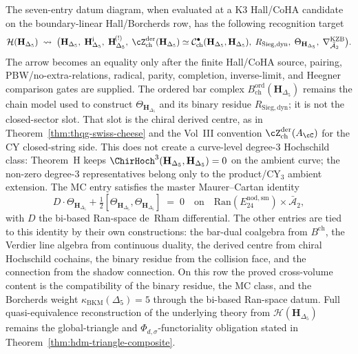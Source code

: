 \begin{remark}
\label{rem:hdm-1}
The seven-entry datum diagram, when evaluated at a K3 Hall/CoHA
candidate on the boundary-linear Hall/Borcherds row, has the following recognition
target
\[
\mathcal H(\mathbf H_{\Delta_5}) \;\leadsto\; \bigl(\mathbf H_{\Delta_5},\;
\mathbf H_{\Delta_5}^{\mathrm i},\;
\mathbf H_{\Delta_5}^{\!(!)},\;
\cZ^{\mathrm{der}}_{\mathrm{ch}}(\mathbf H_{\Delta_5})
\simeq \mathcal{C}^\bullet_{\mathrm{ch}}(\mathbf H_{\Delta_5},
\mathbf H_{\Delta_5}),\; R_{\mathrm{Sieg,dyn}},\;
\Theta_{\mathbf H_{\Delta_5}},\;
\nabla^{\mathrm{KZB}}_{\bar{\mathcal A}_2}\bigr).
\]
The arrow becomes an equality only after the finite Hall/CoHA source,
pairing, PBW/no-extra-relations, radical, parity, completion,
inverse-limit, and Heegner comparison gates are supplied.
The ordered bar complex $B^{\mathrm{ord}}_{\mathrm{ch}}
(\mathbf H_{\Delta_5})$ remains the chain model used to construct
$\Theta_{\mathbf H_{\Delta_5}}$ and its binary residue
$R_{\mathrm{Sieg,dyn}}$; it is not the closed-sector slot. That slot is
the chiral derived centre, as in Theorem~\ref{thm:thqg-swiss-cheese}
and the Vol~III convention
$\cZ^{\mathrm{der}}_{\mathrm{ch}}(A_\cC)$ for the CY closed-string
side. This does not create a curve-level degree-$3$ Hochschild class:
Theorem~H keeps
$\ChirHoch^3(\mathbf H_{\Delta_5},\mathbf H_{\Delta_5})=0$ on the
ambient curve; the non-zero degree-$3$ representatives belong only to
the product/CY$_3$ ambient extension.
The MC entry satisfies the master Maurer--Cartan identity
\[
D\cdot \Theta_{\mathbf H_{\Delta_5}} + \tfrac{1}{2}[\Theta_{\mathbf H_{\Delta_5}}, \Theta_{\mathbf H_{\Delta_5}}] \;=\; 0
\quad\text{on}\quad \mathrm{Ran}(E^{\mathrm{nod,sm}}_{24})\times\bar{\mathcal A}_2,
\]
with $D$ the bi-based Ran-space de~Rham differential. The other
entries are tied to this identity by their own constructions: the
bar-dual coalgebra from $B^{\mathrm{ch}}$, the Verdier line algebra
from continuous duality, the derived centre from chiral Hochschild
cochains, the binary residue from the collision face, and the
connection from the shadow connection. On this row the proved
cross-volume content is the compatibility of the binary residue, the
MC class, and the Borcherds weight
$\kappa_{\mathrm{BKM}}(\Delta_5)=5$ through the bi-based Ran-space
datum. Full quasi-equivalence reconstruction of the underlying theory
from $\mathcal H(\mathbf H_{\Delta_5})$ remains the global-triangle
and $\Phi_{d,\sigma}$-functoriality obligation stated in
Theorem~\ref{thm:hdm-triangle-composite}.
\end{remark}
